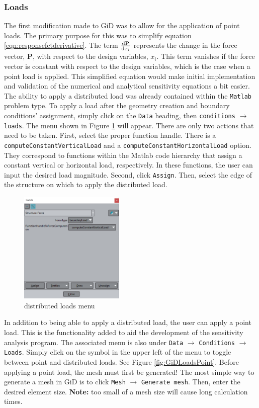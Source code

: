 \subsubsection{Loads}
The first modification made to GiD was to allow for the application of point loads. The primary purpose for this was to simplify equation \ref{eqn:responsefctderivative}. The term $\dv{\textbf{P}}{x_i}$ represents the change in the force vector, $\textbf{P}$, with respect to the design variables, $x_i$. This term vanishes if the force vector is constant with respect to the design variables, which is the case when a point load is applied. This simplified equation would make initial implementation and validation of the numerical and analytical sensitivity equations a bit easier.\\[3pt]
The ability to apply a distributed load was already contained within the \texttt{Matlab} problem type. To apply a load after the geometry creation and boundary conditions' assignment, simply click on the \texttt{Data} heading, then \texttt{conditions} $\rightarrow$ \texttt{loads}. The menu shown in Figure \ref{fig:GiDLoadsDist} will appear. There are only two actions that need to be taken. First, select the proper function handle. There is a \texttt{computeConstantVerticalLoad} and a \texttt{computeConstantHorizontalLoad} option. They correspond to functions within the Matlab code hierarchy that assign a constant vertical or horizontal load, respectively. In these functions, the user can input the desired load magnitude. Second, click \texttt{Assign}. Then, select the edge of the structure on which to apply the distributed load.\\[3pt]
\begin{figure}[ht]
  \centering
  \includegraphics[width=50mm]{images/GiD_loads_dist.png}
  \caption{distributed loads menu}
  \label{fig:GiDLoadsDist}
\end{figure}
In addition to being able to apply a distributed load, the user can apply a point load. This is the functionality added to aid the development of the sensitivity analysis program. The associated menu is also under \texttt{Data} $\rightarrow$ \texttt{Conditions} $\rightarrow$ \texttt{Loads}. Simply click on the symbol in the upper left of the menu to toggle between point and distributed loads. See Figure \ref{fig:GiDLoadsPoint}. Before applying a point load, the mesh must first be generated! The most simple way to generate a mesh in GiD is to click \texttt{Mesh} $\rightarrow$ \texttt{Generate mesh}. Then, enter the desired element size. \textbf{Note:} too small of a mesh size will cause long calculation times.

